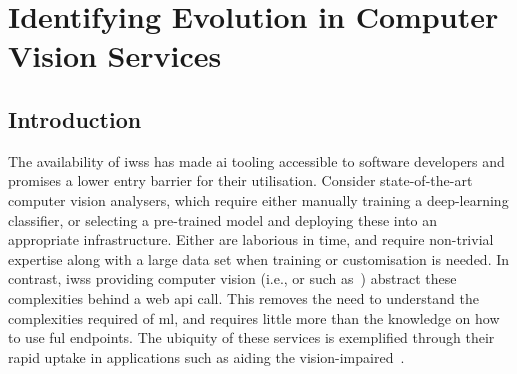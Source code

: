 \chapter[Identifying Evolution in Computer Vision Services]
{Identifying Evolution in Computer Vision Services}
\label{ch:icsme2019}
\graphicspath{{mainmatter/publications/figures/icsme2019/}}

\def \googleapi {A}
\def \azureapi {B}
\def \awsapi {C}

\glsresetall
\begin{abstract}
Recent advances in \gls{ai} and \gls{ml}, such as computer vision, are now available as \glspl{iws} and their accessibility and simplicity is compelling. Multiple vendors now offer this technology as cloud services and developers want to leverage these advances to provide value to end-users. 
However, there is no firm investigation into the maintenance and evolution risks arising from use of these \glspl{iws}; in particular, their behavioural consistency and transparency of their functionality.
We evaluated the responses of three different \glspl{iws} (specifically computer vision) over 11 months using 3 different data sets, verifying responses against the respective documentation and assessing evolution risk. 
We found that there are: (1)~inconsistencies in how these services behave; (2)~evolution risk in the responses; and (3)~a lack of clear communication that documents these risks and inconsistencies.
We propose a set of recommendations to both developers and \gls{iws} providers to inform risk and assist maintainability.
\end{abstract}
\glsresetall


\section{Introduction}

The availability of \glspl{iws} has made \gls{ai} tooling accessible to software developers and promises a lower entry barrier for their utilisation. Consider state-of-the-art computer vision analysers, which require either manually training a deep-learning classifier, or selecting a pre-trained model and deploying these into an appropriate infrastructure. Either are laborious in time, and require non-trivial expertise along with a large data set when training or customisation is needed.
In contrast, \glspl{iws} providing computer vision (i.e.,  or  such as~) abstract these complexities behind a web \gls{api} call. This removes the need to understand the complexities required of \gls{ml}, and requires little more than the knowledge on how to use ful endpoints. The ubiquity of these services is exemplified through their rapid uptake in applications such as aiding the vision-impaired~\citep{Reis:2018cp,daMotaSilveira:2017vp}.

